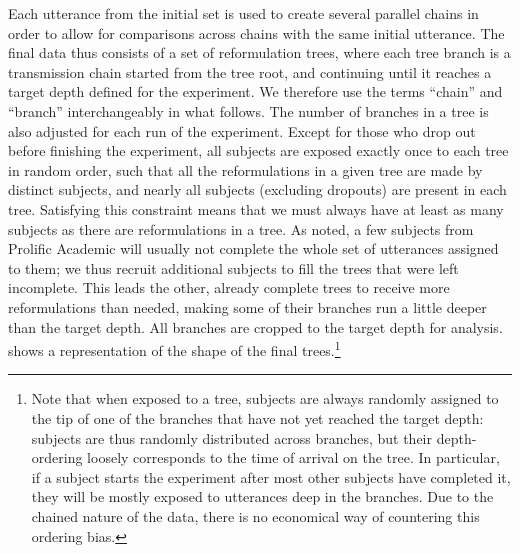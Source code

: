 Each utterance from the initial set is used to create several parallel
chains in order to allow for comparisons across chains with the same
initial utterance. The final data thus consists of a set of
reformulation trees, where each tree branch is a transmission chain
started from the tree root, and continuing until it reaches a target
depth defined for the experiment. We therefore use the terms
  \enquote{chain} and \enquote{branch} interchangeably in what follows.
The number of branches in a tree is also adjusted for each run of the
experiment. Except for those who drop out before finishing the
experiment, all subjects are exposed exactly once to each tree in random
order, such that all the reformulations in a given tree are made by
distinct subjects, and nearly all subjects (excluding dropouts) are
present in each tree. Satisfying this constraint means that we must
always have at least as many subjects as there are reformulations in a
tree. As noted, a few subjects from Prolific Academic will usually not
complete the whole set of utterances assigned to them; we thus recruit
additional subjects to fill the trees that were left incomplete. This
leads the other, already complete trees to receive more reformulations
than needed, making some of their branches run a little deeper than the
target depth. All branches are cropped to the target depth for analysis.
shows a representation of the shape of the final trees.\footnote{Note that when exposed to a tree, subjects are always randomly
assigned to the tip of one of the branches that have not yet reached the
target depth: subjects are thus randomly distributed across branches,
but their depth-ordering loosely corresponds to the time of arrival on
the tree. In particular, if a subject starts the experiment after most
other subjects have completed it, they will be mostly exposed to
utterances deep in the branches. Due to the chained nature of the data,
there is no economical way of countering this ordering bias.}


